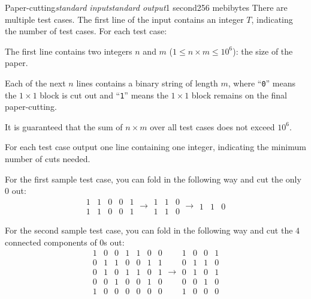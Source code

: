 \begin{problem}{Paper-cutting}{\textsl{standard input}}{\textsl{standard output}}{1 second}{256 mebibytes}
\InputFile
There are multiple test cases. The first line of the input contains an integer $T$, indicating the number of test cases. For each test case:

The first line contains two integers $n$ and $m$ ($1 \le n \times m \le 10^6$): the size of the paper.

Each of the next $n$ lines contains a binary string of length $m$, where ``\texttt{0}'' means the $1 \times 1$ block is cut out and ``\texttt{1}'' means the $1 \times 1$ block remains on the final paper-cutting.

It is guaranteed that the sum of $n \times m$ over all test cases does not exceed $10^6$.


\OutputFile
For each test case output one line containing one integer, indicating the minimum number of cuts needed.




\Example

\begin{example}
%
\end{example}

\Note
For the first sample test case, you can fold in the following way and cut the only $0$ out:
$$\begin{array}{ccc|cc} 1&1&0&0&1\\1&1&0&0&1\end{array} \to \begin{array}{ccc} 1&1&0\\ \hline 1&1&0\end{array} \to \begin{array}{ccc} 1&1&0\end{array}$$

For the second sample test case, you can fold in the following way and cut the $4$ connected components of $0$s out:
$$\begin{array}{cccc|ccc} 1&0&0&1&1&0&0\\0&1&1&0&0&1&1\\0&1&0&1&1&0&1\\0&0&1&0&0&1&0\\1&0&0&0&0&0&0\end{array} \to \begin{array}{cccc} 1&0&0&1\\0&1&1&0\\0&1&0&1\\0&0&1&0\\1&0&0&0\end{array}$$

\end{problem}
